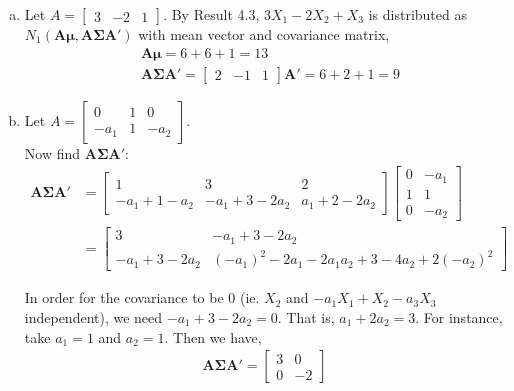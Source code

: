 \documentclass[12pt]{article}\usepackage[]{graphicx}\usepackage[]{color}
\newcommand{\vct}{\mathbf}
\begin{document}
\begin{enumerate}[a)]

\item Let $A = \begin{bmatrix} 3 & -2 & 1 \end{bmatrix}$. By Result 4.3, $3X_1 - 2X_2 + X_3$ is distributed as $N_1(\vct{A}\vct{\mu}, \vct{A}\vct{\Sigma}\vct{A}')$ with mean vector and covariance matrix,
\begin{align*}
&\vct{A}\vct{\mu} = 6 + 6 + 1 = 13\\
&\vct{A}\vct{\Sigma}\vct{A}' = \begin{bmatrix} 2 & -1 & 1 \end{bmatrix}\vct{A}' = 6 + 2 + 1 = 9
\end{align*}

\item Let $A = \begin{bmatrix} 0 & 1 & 0 \\ -a_1 & 1 & -a_2 \end{bmatrix}$.\\

Now find $\vct{A}\vct{\Sigma}\vct{A}'$:
\begin{align*}
\vct{A}\vct{\Sigma}\vct{A}' &= \begin{bmatrix} 1 & 3 & 2 \\ -a_1 + 1 - a_2 & -a_1 + 3 - 2a_2 & a_1 + 2 - 2a_2 \end{bmatrix}\begin{bmatrix} 0 & -a_1 \\ 1 & 1 \\ 0 & -a_2 \end{bmatrix}\\
&= \begin{bmatrix} 3 & -a_1 + 3 - 2a_2 \\ -a_1 + 3 - 2a_2 & (-a_1)^2 - 2a_1 - 2a_1a_2 + 3 - 4a_2 + 2(-a_2)^2  \end{bmatrix}
\end{align*}

In order for the covariance to be 0 (ie. $X_2$ and $-a_1X_1 + X_2 - a_3X_3$ independent), we need $-a_1 + 3 - 2a_2 = 0$. That is, $a_1 + 2a_2 = 3$. For instance, take $a_1 = 1$ and $a_2 = 1$. Then we have,
\begin{align*}
\vct{A}\vct{\Sigma}\vct{A}' = \begin{bmatrix} 3 & 0 \\ 0 & -2 \end{bmatrix}
\end{align*}
\end{enumerate}
\end{document}

